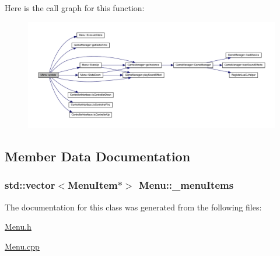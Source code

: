 Here is the call graph for this function:
\nopagebreak
\begin{figure}[H]
\begin{center}
\leavevmode
\includegraphics[width=400pt]{d2/db8/class_menu_a8446e8a1e56e9cf1db93790067510a61_cgraph}
\end{center}
\end{figure}




\subsection{Member Data Documentation}
\hypertarget{class_menu_a2ffd6b14eaa14de15238b45bbc68675e}{
\subsubsection[{\_\-menuItems}]{\setlength{\rightskip}{0pt plus 5cm}std::vector$<${\bf MenuItem}$\ast$$>$ {\bf Menu::\_\-menuItems}}}
\label{d2/db8/class_menu_a2ffd6b14eaa14de15238b45bbc68675e}


The documentation for this class was generated from the following files:\begin{DoxyCompactItemize}
\item 
\hyperlink{_menu_8h}{Menu.h}\item 
\hyperlink{_menu_8cpp}{Menu.cpp}\end{DoxyCompactItemize}
